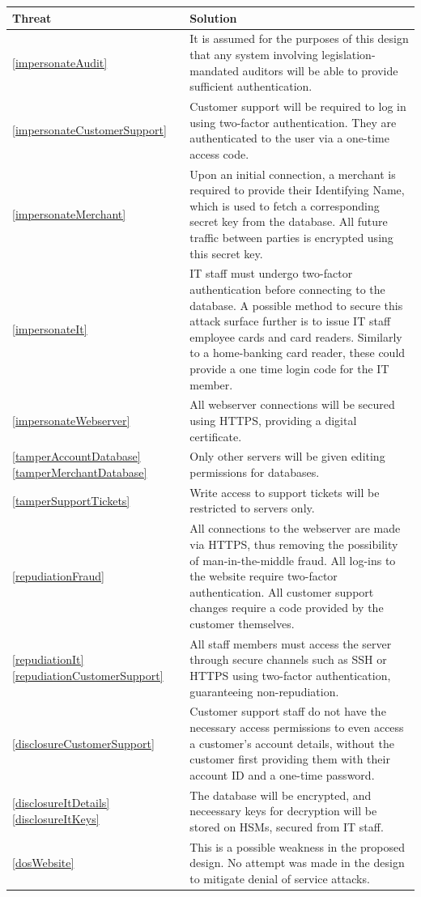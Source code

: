 \begin{longtable}{|| p{} | p{} ||}
    \hline
    Threat & Solution \\
    \hline\hline

              \ref{impersonateAudit} & 
        It is assumed for the purposes of this design that any system involving legislation-mandated auditors will be able to provide sufficient authentication.
    \\ \hline \ref{impersonateCustomerSupport} & 
        Customer support will be required to log in using two-factor authentication. They are authenticated to the user via a one-time access code.
    \\ \hline \ref{impersonateMerchant} &
        Upon an initial connection, a merchant is required to provide their Identifying Name, which is used to fetch a corresponding secret key from the database. All future traffic between parties is encrypted using this secret key.
    \\ \hline \ref{impersonateIt} &
        IT staff must undergo two-factor authentication before connecting to the database. A possible method to secure this attack surface further is to issue IT staff employee cards and card readers. Similarly to a home-banking card reader, these could provide a one time login code for the IT member.
    \\ \hline \ref{impersonateWebserver} &
        All webserver connections will be secured using HTTPS, providing a digital certificate.
    \\ \hline \ref{tamperAccountDatabase} \ref{tamperMerchantDatabase} &
        Only other servers will be given editing permissions for databases.
    \\ \hline \ref{tamperSupportTickets} &
        Write access to support tickets will be restricted to servers only. 
    \\ \hline \ref{repudiationFraud} &
        All connections to the webserver are made via HTTPS, thus removing the possibility of man-in-the-middle fraud. All log-ins to the website require two-factor authentication. All customer support changes require a code provided by the customer themselves.
    \\ \hline \ref{repudiationIt} \ref{repudiationCustomerSupport} &
        All staff members must access the server through secure channels such as SSH or HTTPS using two-factor authentication, guaranteeing non-repudiation. 
    \\ \hline \ref{disclosureCustomerSupport} &
        Customer support staff do not have the necessary access permissions to even access a customer's account details, without the customer first providing them with their account ID and a one-time password.
    \\ \hline \ref{disclosureItDetails} \ref{disclosureItKeys} &
        The database will be encrypted, and neceessary keys for decryption will be stored on HSMs, secured from IT staff.
    \\ \hline \textcolor{red}{\ref{dosWebsite}} &
        This is a possible weakness in the proposed design. No attempt was made in the design to mitigate denial of service attacks.


\end{longtable}
